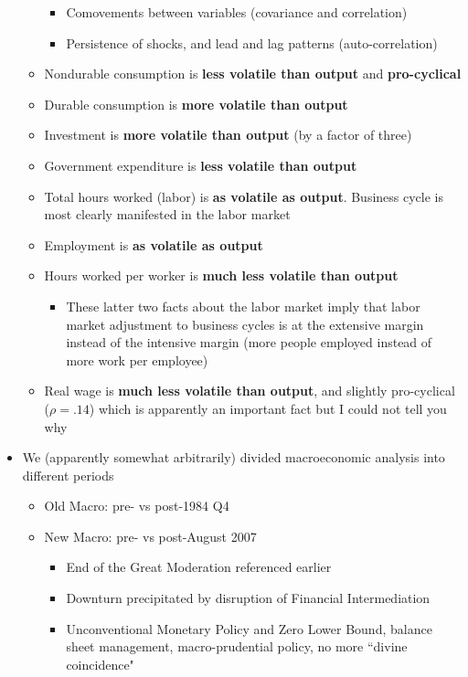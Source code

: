 \documentclass[12pt]{article}
\begin{document}
\begin{itemize}
\begin{itemize}
\begin{itemize}
            \item Comovements between variables (covariance and correlation)
            \item Persistence of shocks, and lead and lag patterns (auto-correlation)
        \end{itemize}
        \item Nondurable consumption is \textbf{less volatile than output} and \textbf{pro-cyclical}
        \item Durable consumption is \textbf{more volatile than output}
        \item Investment is \textbf{more volatile than output} (by a factor of three)
        \item Government expenditure is \textbf{less volatile than output}
        \item Total hours worked (labor) is \textbf{as volatile as output}. Business cycle is most clearly manifested in the labor market
        \item Employment is \textbf{as volatile as output}
        \item Hours worked per worker is \textbf{much less volatile than output}
        \begin{itemize}
            \item These latter two facts about the labor market imply that labor market adjustment to business cycles is at the extensive margin instead of the intensive margin (more people employed instead of more work per employee)
        \end{itemize}
        \item Real wage is \textbf{much less volatile than output}, and slightly pro-cyclical ($\rho = .14$) which is apparently an important fact but I could not tell you why
    \end{itemize}
    \item We (apparently somewhat arbitrarily) divided macroeconomic analysis into different periods
    \begin{itemize}
        \item Old Macro: pre- vs post-1984 Q4
        \item New Macro: pre- vs post-August 2007
        \begin{itemize}
            \item End of the Great Moderation referenced earlier
            \item Downturn precipitated by disruption of Financial Intermediation
            \item Unconventional Monetary Policy and Zero Lower Bound, balance sheet management, macro-prudential policy, no more ``divine coincidence"

\end{itemize}
\end{itemize}
\end{itemize}
\end{document}

